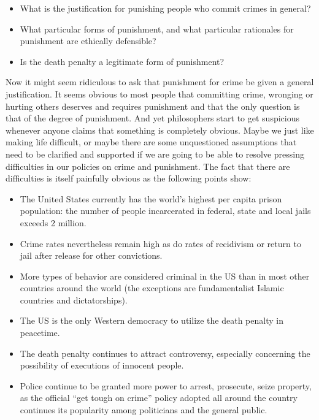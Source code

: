 \documentclass[
  12pt, openany]{book}
\makeatletter
\providecommand{\tightlist}{%
  \setlength{\itemsep}{0pt}\setlength{\parskip}{0pt}}
\newenvironment{kframe}{%
\medskip{}
\setlength{\fboxsep}{.8em}
 \def\at@end@of@kframe{}%
 \ifinner\ifhmode%
  \def\at@end@of@kframe{\end{minipage}}%
  \begin{minipage}{\columnwidth}%
 \fi\fi%
 \def\FrameCommand##1{\hskip\@totalleftmargin \hskip-\fboxsep
 \colorbox{shadecolor}{##1}\hskip-\fboxsep
     \hskip-\linewidth \hskip-\@totalleftmargin \hskip\columnwidth}%
 \MakeFramed {\advance\hsize-\width
   \@totalleftmargin\z@ \linewidth\hsize
   \@setminipage}}%
 {\par\unskip\endMakeFramed%
 \at@end@of@kframe}
\newenvironment{rmdblock}[1]
  {
  \begin{itemize}
  \renewcommand{\labelitemi}{
    \raisebox{-.7\height}[0pt][0pt]{
      {\setkeys{Gin}{width=3em,keepaspectratio}\texttt{[image: img/\#1]}}
    }
  }
  \setlength{\fboxsep}{1em}
  \begin{kframe}
  \item
  }
  {
  \end{kframe}
  \end{itemize}
  }
\newenvironment{question}
  {\begin{rmdblock}{question}}
  {\end{rmdblock}}
\makeatother
\begin{document}
\begin{question}

\begin{itemize}
\tightlist
\item
  What is the justification for punishing people who commit crimes in general?
\item
  What particular forms of punishment, and what particular rationales for punishment are ethically defensible?
\item
  Is the death penalty a legitimate form of punishment?
\end{itemize}

\end{question}

Now it might seem ridiculous to ask that punishment for crime be given a general justification. It seems obvious to most people that committing crime, wronging or hurting others deserves and requires punishment and that the only question is that of the degree of punishment. And yet philosophers start to get suspicious whenever anyone claims that something is completely obvious. Maybe we just like making life difficult, or maybe there are some unquestioned assumptions that need to be clarified and supported if we are going to be able to resolve pressing difficulties in our policies on crime and punishment. The fact that there are difficulties is itself painfully obvious as the following points show:

\begin{itemize}
\tightlist
\item
  The United States currently has the world's highest per capita prison population: the number of people incarcerated in federal, state and local jails exceeds 2 million.
\item
  Crime rates nevertheless remain high as do rates of recidivism or return to jail after release for other convictions.
\item
  More types of behavior are considered criminal in the US than in most other countries around the world (the exceptions are fundamentalist Islamic countries and dictatorships).
\item
  The US is the only Western democracy to utilize the death penalty in peacetime.
\item
  The death penalty continues to attract controversy, especially concerning the possibility of executions of innocent people.
\item
  Police continue to be granted more power to arrest, prosecute, seize property, as the official ``get tough on crime'' policy adopted all around the country continues its popularity among politicians and the general public.
\end{itemize}
\end{document}

